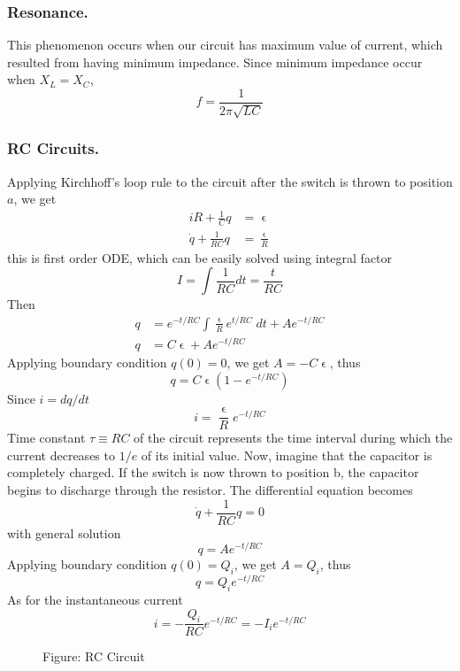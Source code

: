 \documentclass[../../../main.tex]{subfiles}
\begin{document}
\subsubsection{Resonance.} This phenomenon occurs when our circuit has maximum value of current, which resulted from having minimum impedance. Since minimum impedance occur when $X_L=X_C$,
\begin{equation*}
    f=\frac{1}{2\pi\sqrt{LC}}
\end{equation*}

\subsubsection{RC Circuits.} Applying Kirchhoff’s loop rule to the circuit after the switch is thrown to position $a$, we get 
\begin{align*}
    iR+\frac{1}{C}q&=\upvarepsilon\\
    \dot{q}+\frac{1}{RC}q&=\frac{\upvarepsilon}{R}
\end{align*}
this is first order ODE, which can be easily solved using integral factor
\begin{equation*}
    I=\int \frac{1}{RC}dt=\frac{t}{RC}
\end{equation*} 
Then
\begin{align*}
    q&=e^{-t/RC}\int \frac{\upvarepsilon}{R}e^{t/RC}\;dt+Ae^{-t/RC}\\
    q&=C\upvarepsilon+Ae^{-t/RC}
\end{align*}
Applying boundary condition $q(0)=0$, we get $A=-C\upvarepsilon$, thus 
\begin{equation*}
    q=C\upvarepsilon(1-e^{-t/RC})
\end{equation*}
Since $i=dq/dt$
\begin{equation*}
    i=\frac{\upvarepsilon}{R}e^{-t/RC}
\end{equation*}
Time constant $\tau\equiv RC$ of the circuit represents the time interval during which the current decreases to $1/e$ of its initial value. Now, imagine that the capacitor is completely charged. If the switch is now thrown to position b, the capacitor begins to discharge through the resistor. The differential equation becomes
\begin{equation*}   
    \dot{q}+\frac{1}{RC}q=0
\end{equation*}
with general solution 
\begin{equation*}
    q=Ae^{-t/RC}
\end{equation*}
Applying boundary condition $q(0)=Q_i$, we get $A=Q_i$, thus 
\begin{equation*}
    q=Q_ie^{-t/RC}
\end{equation*}
As for the instantaneous current
\begin{equation*}
i=-\frac{Q_i}{RC}e^{-t/RC}=-I_ie^{-t/RC}
\end{equation*}
\begin{figure*}
    \centering
    \caption*{Figure: RC Circuit}
\end{figure*}
\end{document}
